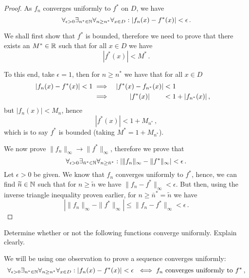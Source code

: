 \documentclass[week=5]{homework}
\newcommand*\centermathcell[1]{\omit\hfil$\displaystyle#1$\hfil\ignorespaces}
\begin{document}
\begin{questions}
\begin{parts}
\begin{proof}
				As $f_n$ converges uniformly to $f^*$ on $D$, we have
				\[
					\forall_{\epsilon > 0}\exists_{n^* \in \naturals}\forall_{n\geq n^*}\forall_{x\in D}: |f_n(x) - f^*(x)| < \epsilon\,.
				\]
				
				We shall first show that $f^*$ is bounded, therefore we need to prove that there exists an $M^* \in \mathbb{R}$ such that for all $x \in D$ we have
				\[
					|f^*(x)| < M^*\,.
				\]
				
				To this end, take $\epsilon = 1$, then for $n \geq n^*$ we have that for all $x \in D$
				\begin{alignat*}{2}
					|f_n(x) - f^*(x)| < 1 \implies&{}&\centermathcell{|f^*(x) - f_{n^*}(x)|} &< 1\\
					\implies&{}& \centermathcell{|f^*(x)|}&< 1 + |f_{n^*}(x)|\,,
				\end{alignat*} 
				but $|f_n(x)| < M_n$, hence
				\[	|f^*(x)| < 1 + M_{n^*}\,, \]
				which is to say $f^*$ is bounded (taking $M^* = 1 + M_{n^*}$).
				
				We now prove $\| f_n \|_\infty \to \| f^* \|_\infty$, therefore we prove that
				\[
					\forall_{\epsilon > 0}\exists_{\bar n^* \in \naturals}\forall_{n\geq \bar n^*}: |\|f_n\|_\infty - \|f^*\|_\infty| < \epsilon\,.
				\]
				Let $\epsilon > 0$ be given. We know that $f_n$ converges uniformly to $f^*$, hence, we can find $\widetilde n \in \mathbb{N}$ such that for $n \geq \widetilde n$ we have $\| f_n - f^* \|_\infty < \epsilon$. But then, using the inverse triangle inequality proven earlier, for $n \geq \bar n^* = \widetilde n$ we have
				\[
				|\|f_n\|_\infty - \|f^*\|_\infty| \leq \| f_n - f^* \|_\infty < \epsilon\,.
				\]
				
			\end{proof}
		\end{parts}
		
		\question
		Determine whether or not the following functions converge uniformly. Explain clearly.
		
		We will be using one observation to prove a sequence converges uniformly:
		\begin{equation} \label{Q4:unif:def}
		\forall_{\epsilon > 0}\exists_{n^* \in \naturals}\forall_{n \geq n^*}\forall_{x \in D}: |f_n(x) - f^*(x)| < \epsilon\ \iff  f_n \text{ converges uniformly to } f^*\,,
		\end{equation}
		

\end{questions}
\end{document}
